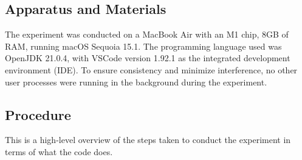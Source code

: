 \documentclass[unicode,11pt,a4paper,oneside,numbers=endperiod,openany]{scrartcl}
\begin{document}
    \subsection{Apparatus and Materials}

    The experiment was conducted on a MacBook Air with an M1 chip, 8GB of RAM, running macOS Sequoia 15.1. The programming language used was OpenJDK 21.0.4, with VSCode version 1.92.1 as the integrated development environment (IDE). To ensure consistency and minimize interference, no other user processes were running in the background during the experiment.

    \subsection{Procedure}

    This is a high-level overview of the steps taken to conduct the experiment in terms of what the code does. \\
\end{document}
